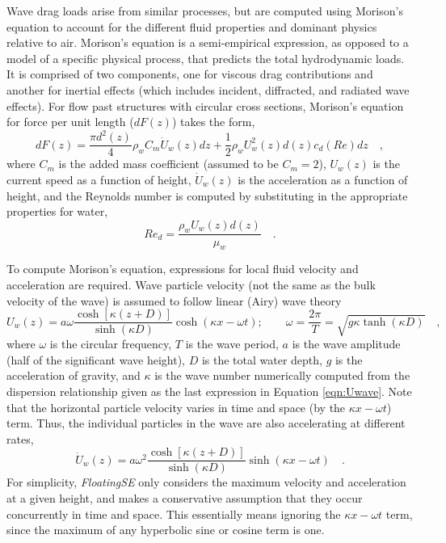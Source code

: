 Wave drag loads arise from similar processes, but are computed using
Morison's equation to account for the different fluid properties and
dominant physics relative to air.  Morison's equation is a
semi-empirical expression, as opposed to a model of a specific physical
process, that predicts the total hydrodynamic loads.  It is comprised of
two components, one for viscous drag contributions and another for
inertial effects (which includes incident, diffracted, and radiated wave
effects).  For flow past structures with circular cross sections,
Morison's equation for force per unit length ($dF(z)$) takes the form,
\begin{equation} \label{eqn:morison}
  dF(z) = \frac{\pi d^2(z)}{4} \rho_w C_m \dot{U}_w(z)dz + \frac{1}{2} \rho_w U_w^2(z) d(z) c_d(Re)dz\quad,
\end{equation}
where $C_m$ is the added mass coefficient (assumed to be $C_m=2$),
$U_w(z)$ is the current speed as a function of height, $\dot{U}_w(z)$ is
the acceleration as a function of height, and the Reynolds number is
computed by substituting in the appropriate properties for water,
\[
Re_d = \frac{\rho_w U_w(z) d(z)}{\mu_w}\quad.
\]

To compute Morison's equation, expressions for local fluid velocity and
acceleration are required.  Wave particle velocity (not the same as the bulk
velocity of the wave) is assumed to follow linear (Airy) wave theory
\begin{equation} \label{eqn:Uwave}
U_w(z) = a\omega\frac{\cosh\left[\kappa\left(z + D \right)\right]}{\sinh\left(\kappa D\right)}\cosh\left(\kappa x -
  \omega t\right);
\qquad \omega=\frac{2\pi}{T} = \sqrt{ g \kappa \tanh\left(\kappa
    D\right) } \quad,
\end{equation}
where $\omega$ is the circular frequency, $T$ is the wave period, $a$ is
the wave amplitude (half of the significant wave height), $D$ is the
total water depth, $g$ is the acceleration of gravity, and $\kappa$ is
the wave number numerically computed from the dispersion relationship
given as the last expression in Equation \ref{eqn:Uwave}.  Note that the
horizontal particle velocity varies in time and space (by the
$\kappa x - \omega t$) term.  Thus, the individual particles in the wave
are also accelerating at different rates,
\begin{equation} \label{eqn:Awave}
\dot{U}_w(z) = a\omega^2\frac{\cosh\left[\kappa\left(z + D \right)\right]}{\sinh\left(\kappa D\right)}\sinh\left(\kappa x -
  \omega t\right)\quad.
\end{equation}
For
simplicity, \textit{FloatingSE} only considers the maximum velocity and
acceleration at a given height, and makes a conservative assumption that
they occur concurrently in time and space.  This essentially means ignoring the
$\kappa x - \omega t$ term, since the maximum of any hyperbolic sine or cosine
term is one.



